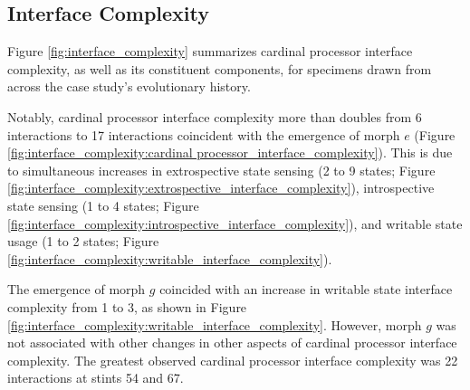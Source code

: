 


\subsection{Interface Complexity}



Figure \ref{fig:interface_complexity} summarizes cardinal processor interface complexity, as well as its constituent components, for specimens drawn from across the case study's evolutionary history.

Notably, cardinal processor interface complexity more than doubles from 6 interactions to 17 interactions coincident with the emergence of morph $e$ (Figure \ref{fig:interface_complexity:cardinal processor_interface_complexity}).
This is due to simultaneous increases in extrospective state sensing (2 to 9 states; Figure \ref{fig:interface_complexity:extrospective_interface_complexity}), introspective state sensing (1 to 4 states; Figure \ref{fig:interface_complexity:introspective_interface_complexity}), and writable state usage (1 to 2 states; Figure \ref{fig:interface_complexity:writable_interface_complexity}).

The emergence of morph $g$ coincided with an increase in writable state interface complexity from 1 to 3, as shown in Figure \ref{fig:interface_complexity:writable_interface_complexity}.
However, morph $g$ was not associated with other changes in other aspects of cardinal processor interface complexity.
The greatest observed cardinal processor interface complexity was 22 interactions at stints 54 and 67.

